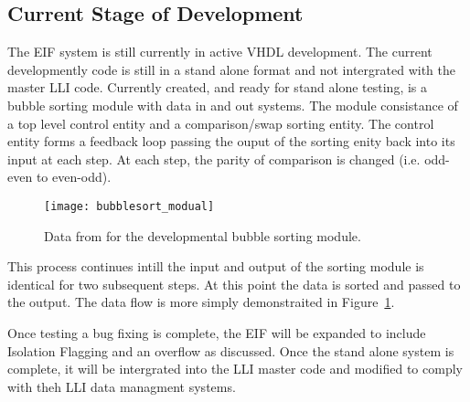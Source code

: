 	\subsection{Current Stage of Development} 
		The EIF system is still currently in active VHDL development.
		The current developmently code is still in a stand alone format and not intergrated with the master LLI code.
		Currently created, and ready for stand alone testing, is a bubble sorting module with data in and out systems.
		The module consistance of a top level control entity and a comparison/swap sorting entity.
		The control entity forms a feedback loop passing the ouput of the sorting enity back into its input at each step.
		At each step, the parity of comparison is changed (i.e. odd-even to even-odd).
		\begin{figure}[h]
			\centering
			\texttt{[image: bubblesort\_modual]}
			\caption{Data from for the developmental bubble sorting module.}
			\label{fig:bubble_data_flow}
		\end{figure}
		\par
		This process continues intill the input and output of the sorting module is identical for two subsequent steps.
		At this point the data is sorted and passed to the output.
		The data flow is more simply demonstraited in Figure~\ref{fig:bubble_data_flow}.
		\par
		Once testing a bug fixing is complete, the EIF will be expanded to include Isolation Flagging and an overflow as discussed.
		Once the stand alone system is complete, it will be intergrated into the LLI master code and modified to comply with theh LLI data managment systems.

		\FloatBarrier